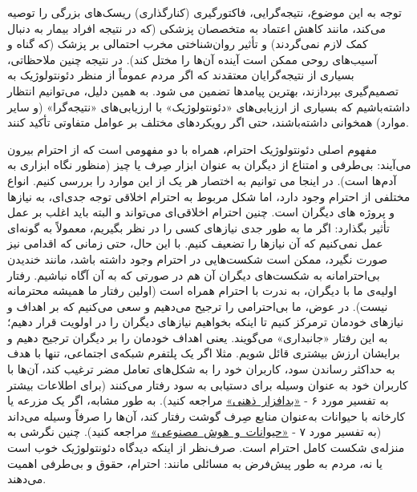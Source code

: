 توجه به این موضوع، نتیجه‌گرایی، فاکتورگیری (کنارگذاری) ریسک‌های بزرگی را توصیه می‌کند، مانند کاهش اعتماد به متخصصان پزشکی (که در نتیجه افراد بیمار به دنبال کمک لازم نمی‌گردند) و تأثیر روان‌شناختی مخرب احتمالی بر پزشک (که گناه و آسیب‌های روحی ممکن است آینده آن‌ها را مختل کند).
در نتیجه چنین ملاحظاتی، بسیاری از نتیجه‌گرایان معتقدند که اگر مردم عموماً از منظر دئونتولوژیک به تصمیم‌گیری بپردازند، بهترین پیامدها تضمین می شود.
به همین دلیل، می‌توانیم انتظار داشته‌باشیم که بسیاری از ارزیابی‌های «دئونتولوژیک» با ارزیابی‌های «نتیجه‌گرا» (و سایر موارد) همخوانی داشته‌باشند، حتی اگر رویکردهای مختلف بر عوامل متفاوتی تأکید کنند.

مفهوم اصلی دئونتولوژیک احترام، همراه با دو مفهومی است که از احترام بیرون می‌آیند: بی‌طرفی و امتناع از دیگران به عنوان ابزار صِرف یا چیز (منظور نگاه ابزاری به آدم‌ها است).
در اینجا می توانیم به اختصار هر یک از این موارد را بررسی کنیم.
انواع مختلفی از احترام وجود دارد، اما شکل مربوط به احترام اخلاقی توجه جدی‌ای، به نیازها و پروژه های دیگران است.
چنین احترام اخلاقی‌ای می‌تواند و البته باید اغلب بر عمل تأثیر بگذارد: اگر ما به طور جدی نیازهای کسی را در نظر بگیریم، معمولاً به گونه‌ای عمل نمی‌کنیم که آن نیازها را تضعیف کنیم.
با این حال، حتی زمانی که اقدامی نیز صورت نگیرد، ممکن است شکست‌هایی در احترام وجود داشته باشد، مانند خندیدن بی‌احترامانه به شکست‌های دیگران آن هم در صورتی که به آن آگاه نباشیم.
رفتار اولیه‌ی ما با دیگران، به ندرت با احترام همراه است (اولین رفتار ما همیشه محترمانه نیست).
در عوض، ما بی‌احترامی را ترجیح می‌دهیم و سعی می‌کنیم که بر اهداف و نیازهای خودمان ترمرکز کنیم تا اینکه بخواهیم نیازهای دیگران را در اولویت قرار دهیم؛ به این رفتار «جانبداری» می‌گویند.
یعنی اهداف خودمان را بر دیگران ترجیح دهیم و برایشان ارزش بیشتری قائل شویم.
مثلا اگر یک پلتفرم شبکه‌ی اجتماعی، تنها با هدف به حداکثر رساندن سود، کاربران خود را به شکل‌های تعامل مضر ترغیب کند، آن‌ها با کاربران خود به عنوان وسیله برای دستیابی به سود رفتار می‌کنند (برای اطلاعات بیشتر به تفسیر مورد ۶ - \hyperref[subsec:مورد۶ - بدافزار ذهنی: الگوریتم‌ها و معماری انتخاب]{\mbox{«بدافزار ذهنی»}} مراجعه کنید).
به طور مشابه، اگر یک مزرعه یا کارخانه با حیوانات به‌عنوان منابع صِرف گوشت رفتار کند، آن‌ها را صرفاً وسیله می‌داند (به تفسیر مورد ۷ - \hyperref[subsec:مورد۷ - هوش مصنوعی و موجودات غیر انسان]{\mbox{«حیوانات و هوش مصنوعی»}} مراجعه کنید).
چنین نگرشی به منزله‌ی شکست کامل احترام است.
صرف‌نظر از اینکه دیدگاه دئونتولوژیک خوب است یا نه، مردم به طور پیش‌فرض به مسائلی مانند: احترام، حقوق و بی‌طرفی اهمیت می‌دهند.

